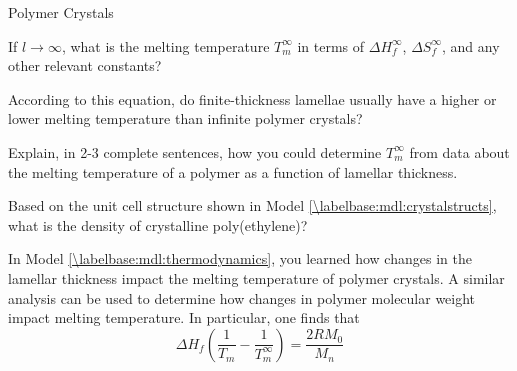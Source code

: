 \begin{activity}{Polymer Crystals}
\begin{infobox}
\end{infobox}
	
\begin{ctqs}	
	
	\question If $l\to\infty$, what is the melting temperature $T_m^\infty$ in terms of $\Delta H_f^\infty$, $\Delta S_f^\infty$, and any other relevant constants?
	
		\begin{solution}[0.5in]
		\end{solution}
			
	\question According to this equation, do finite-thickness lamellae usually have a higher or lower melting temperature than infinite polymer crystals?
	
		\begin{solution}[0.5in]
		\end{solution}
	
	\question Explain, in 2-3 complete sentences, how you could determine $T_m^\infty$ from data about the melting temperature of a polymer as a function of lamellar thickness.
	
		\begin{solution}[1.5in]
		\end{solution}
 
\end{ctqs}

%
%	
%
%	
%	

\begin{exercises}


	\exercise Based on the unit cell structure shown in Model \ref{\labelbase:mdl:crystalstructs}, what is the density of crystalline poly(ethylene)?
	
	\exercise In Model \ref{\labelbase:mdl:thermodynamics}, you learned how changes in the lamellar thickness impact the melting temperature of polymer crystals. A similar analysis can be used to determine how changes in polymer molecular weight impact melting temperature.  In particular, one finds that
		\begin{equation*}
			\Delta H_f\left(\frac{1}{T_m} - \frac{1}{T_m^\infty}\right) = \frac{2 R M_0}{M_n}
		\end{equation*}
		

\end{exercises}
\end{activity}
